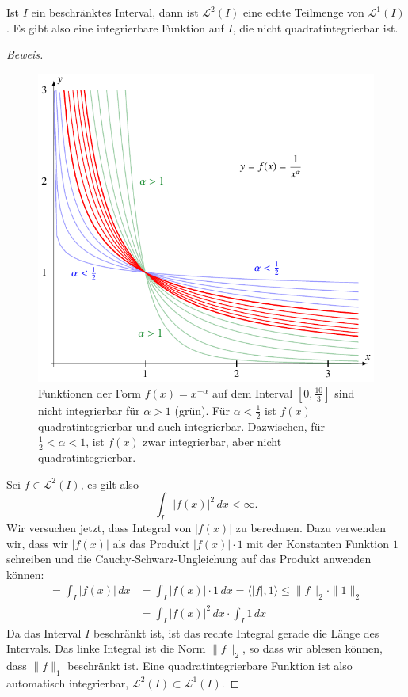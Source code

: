 \begin{lemma}
\label{fourier:l1l2}
Ist $I$ ein beschränktes Interval, dann ist $\mathcal{L}^2(I)$ eine
echte Teilmenge von $\mathcal{L}^1(I)$.
Es gibt also eine integrierbare Funktion auf $I$, die nicht
quadratintegrierbar ist.
\end{lemma}

\begin{proof}[Beweis]
\begin{figure}
\centering
\includegraphics{chapters/2-fourier/images/intfun.pdf}
\caption{Funktionen der Form $f(x)=x^{-\alpha}$ auf dem Interval
$[0,\frac{10}{3}]$ sind nicht integrierbar für $\alpha > 1$ (grün).
Für $\alpha <\frac12$ ist $f(x)$ quadratintegrierbar und auch integrierbar.
Dazwischen, für $\frac12 <\alpha < 1$, ist $f(x)$ zwar integrierbar, aber
nicht quadratintegrierbar.
\label{fourier:intfun}}
\end{figure}
Sei $f\in\mathcal{L}^2(I)$, es gilt also
\[
\int_I |f(x)|^2\,dx < \infty.
\]
Wir versuchen jetzt, dass Integral von $|f(x)|$ zu berechnen.
Dazu verwenden wir, dass wir $|f(x)|$ als das Produkt
$|f(x)|\cdot 1$ mit der Konstanten Funktion $1$ schreiben
und die Cauchy-Schwarz-Ungleichung auf das Produkt anwenden können:
\begin{align*}
=
\int_I |f(x)|\,dx
&=
\int_I |f(x)| \cdot 1 \,dx
=
\langle |f|, 1\rangle
\le
\|f\|_2 \cdot \| 1 \|_2
\\
&=
\int_I |f(x)|^2\,dx \cdot \int_I 1\,dx
\end{align*}
Da das Interval $I$ beschränkt ist, ist das rechte Integral gerade die
Länge des Intervals.
Das linke Integral ist die Norm $\|f\|_2$, so dass wir ablesen können,
dass $\|f\|_1$ beschränkt ist.
Eine quadratintegrierbare Funktion ist also automatisch integrierbar,
$\mathcal{L}^2(I)\subset \mathcal{L}^1(I)$.


\end{proof}
